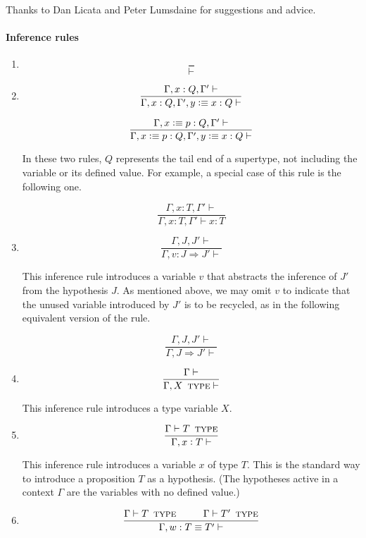 \documentclass[11pt]{article}
\newcommand{\eqd}{\equiv}
\newcommand\spc{{\hskip 26pt}}
\newcommand{\ccolon}{\vcentcolon}
\newcommand{\TYPE}{\mathop{\text{ \sc type}}}
\newcommand{\Okay}{\mathop{\text{ \sc okay}}}
\newcommand{\Context}{\vdash\Okay}
\renewcommand{\Context}{\vdash}
\newcommand{\defn}{\vcentcolon\equiv}
\begin{document}
Thanks to Dan Licata and Peter Lumsdaine for suggestions and advice.

\paragraph{Inference rules} 

\begin{enumerate}

\item
\[\frac{}{\Context}\]

\item

\[\frac{\Gamma,x:Q,\Gamma'\Context}{\Gamma,x:Q,\Gamma',y\defn x : Q \Context}\]

\[\frac{\Gamma,x \defn p :Q,\Gamma'\Context}{\Gamma,x \defn p :Q,\Gamma',y\defn x : Q \Context}\]

In these two rules, $Q$ represents the tail end of a supertype, not including
the variable or its defined value.  For example, a special case of this rule is the following one.

\[\frac{\Gamma,x:T,\Gamma'\Context}{\Gamma,x:T,\Gamma' \vdash x : T}\]


\item
\[\frac{\Gamma,J,J'\Context}{\Gamma,v : J \Rightarrow J' \Context}\]

This inference rule introduces a variable $v$ that abstracts the inference of $J'$ from the hypothesis $J$.
As mentioned above, we may omit $v$ to indicate that the unused variable introduced by $J'$ is to be recycled, as 
in the following equivalent version of the rule.

\[\frac{\Gamma,J,J'\Context}{\Gamma,J \Rightarrow J' \Context}\]

\item
\[\frac{\Gamma\Context}{\Gamma, X \TYPE \Context}\]

This inference rule introduces a type variable $X$.

\item
\[\frac{\Gamma \vdash T \TYPE}{\Gamma, x \ccolon T \Context}\]

This inference rule introduces a variable $x$ of type $T$.  This is the
standard way to introduce a proposition $T$ as a hypothesis.  (The hypotheses
active in a context $\Gamma$ are the variables with no defined value.)

\item
\[\frac{
  \Gamma \vdash T \TYPE  
  \spc
  \Gamma \vdash T' \TYPE }
{\Gamma, w : T \eqd T' \Context}\]


\end{enumerate}
\end{document}
